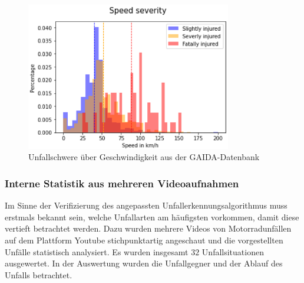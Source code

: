 \begin{figure}
	\centering
	\includegraphics[width=0.8\textwidth]{Bilder/SpeedSeverity.png}
	\caption{Unfallschwere über Geschwindigkeit aus der GAIDA-Datenbank\citep{Maire2020}}
	\label{fig:SpeedSeverity}
\end{figure}

%
%
%

\subsubsection{Interne Statistik aus mehreren Videoaufnahmen}



Im Sinne der Verifizierung des angepassten Unfallerkennungsalgorithmus muss erstmals bekannt sein, welche Unfallarten am häu\-figsten vorkommen, damit diese vertieft betrachtet werden. Dazu wurden mehrere Videos von Motorradunfällen auf dem Plattform \glqq Youtube\grqq{} stichpunktartig angeschaut und die vorgestellten Unfälle statistisch analysiert. Es wurden insgesamt $32$ Unfallsituationen ausgewertet. In der Auswertung wurden die Unfallgegner und der Ablauf des Unfalls betrachtet. \citep{YTMotoCrashComp} \citep{YTCrazyDriverVsBiker} \citep{YTMotoCrashedAndMishaps} \citep{YTAnimalsVsBikers} \citep{YTMotoCrashesRoad}


